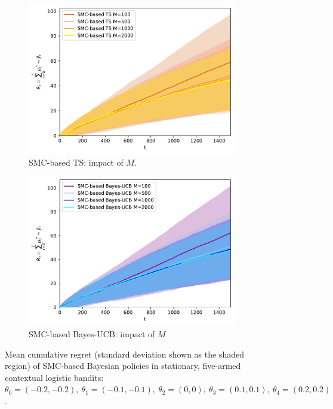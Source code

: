 \begin{figure}[!h]
	\begin{subfigure}[b]{0.46\textwidth}
		\centering
		\includegraphics[width=\textwidth]{./fods_figs/static/logistic/A5/theta-0.2_-0.2_-0.1_-0.1_0._0._0.1_0.1_0.2_0.2_allM_cumulative_regret_ts}
		\caption{SMC-based TS: impact of $M$.}
	\end{subfigure}
	\begin{subfigure}[b]{0.46\textwidth}
		\centering
		\includegraphics[width=\textwidth]{./fods_figs/static/logistic/A5/theta-0.2_-0.2_-0.1_-0.1_0._0._0.1_0.1_0.2_0.2_allM_cumulative_regret_bucb}
		\caption{SMC-based Bayes-UCB: impact of $M$}
	\end{subfigure}
	
	\caption{Mean cumulative regret (standard deviation shown as the shaded region) of SMC-based Bayesian policies in
		stationary, five-armed contextual logistic bandits:
		$\theta_0=(-0.2,-0.2), \ \theta_1=(-0.1,-0.1), \ \theta_2=(0,0), \ \theta_3=(0.1,0.1), \ \theta_4=(0.2,0.2)$.
	}
\end{figure}

